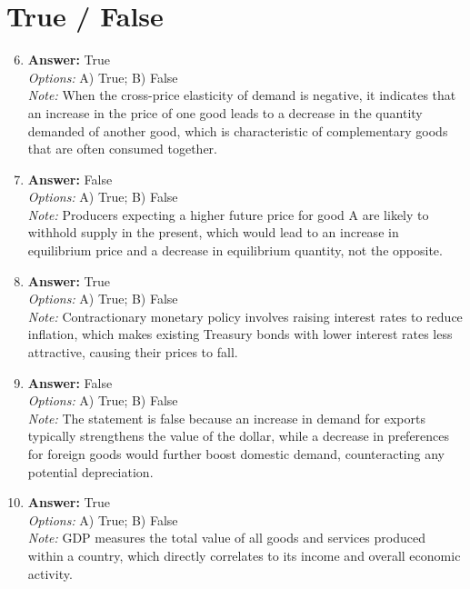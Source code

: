 \documentclass[12pt]{article}
\begin{document}
\section*{True / False}
\begin{enumerate}[label=\arabic*.]
\setcounter{enumi}{5}
\item \textbf{Answer:} True
\\ \textit{Options:} A) True; B) False
\\ \textit{Note:} When the cross-price elasticity of demand is negative, it indicates that an increase in the price of one good leads to a decrease in the quantity demanded of another good, which is characteristic of complementary goods that are often consumed together.
\item \textbf{Answer:} False
\\ \textit{Options:} A) True; B) False
\\ \textit{Note:} Producers expecting a higher future price for good A are likely to withhold supply in the present, which would lead to an increase in equilibrium price and a decrease in equilibrium quantity, not the opposite.
\item \textbf{Answer:} True
\\ \textit{Options:} A) True; B) False
\\ \textit{Note:} Contractionary monetary policy involves raising interest rates to reduce inflation, which makes existing Treasury bonds with lower interest rates less attractive, causing their prices to fall.
\item \textbf{Answer:} False
\\ \textit{Options:} A) True; B) False
\\ \textit{Note:} The statement is false because an increase in demand for exports typically strengthens the value of the dollar, while a decrease in preferences for foreign goods would further boost domestic demand, counteracting any potential depreciation.
\item \textbf{Answer:} True
\\ \textit{Options:} A) True; B) False
\\ \textit{Note:} GDP measures the total value of all goods and services produced within a country, which directly correlates to its income and overall economic activity.
\end{enumerate}
\end{document}

